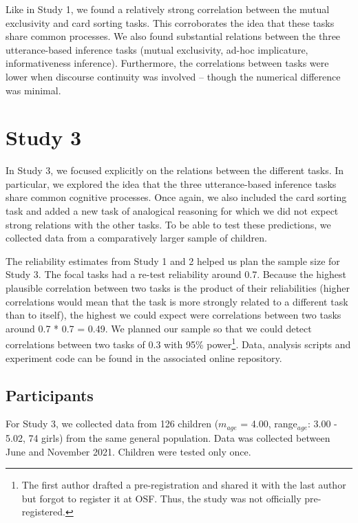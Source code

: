 \documentclass[
  man,floatsintext]{apa6}
\begin{document}
Like in Study 1, we found a relatively strong correlation between the mutual exclusivity and card sorting tasks. This corroborates the idea that these tasks share common processes. We also found substantial relations between the three utterance-based inference tasks (mutual exclusivity, ad-hoc implicature, informativeness inference). Furthermore, the correlations between tasks were lower when discourse continuity was involved -- though the numerical difference was minimal.

\hypertarget{study-3}{%
\section{Study 3}\label{study-3}}

In Study 3, we focused explicitly on the relations between the different tasks. In particular, we explored the idea that the three utterance-based inference tasks share common cognitive processes. Once again, we also included the card sorting task and added a new task of analogical reasoning for which we did not expect strong relations with the other tasks. To be able to test these predictions, we collected data from a comparatively larger sample of children.

The reliability estimates from Study 1 and 2 helped us plan the sample size for Study 3. The focal tasks had a re-test reliability around 0.7. Because the highest plausible correlation between two tasks is the product of their reliabilities (higher correlations would mean that the task is more strongly related to a different task than to itself), the highest we could expect were correlations between two tasks around 0.7 * 0.7 = 0.49. We planned our sample so that we could detect correlations between two tasks of 0.3 with 95\% power\footnote{The first author drafted a pre-registration and shared it with the last author but forgot to register it at OSF. Thus, the study was not officially pre-registered.}. Data, analysis scripts and experiment code can be found in the associated online repository.

\hypertarget{participants-2}{%
\subsection{Participants}\label{participants-2}}

For Study 3, we collected data from 126 children (\(m_{age}\) = 4.00, range\(_{age}\): 3.00 - 5.02, 74 girls) from the same general population. Data was collected between June and November 2021. Children were tested only once.
\end{document}
